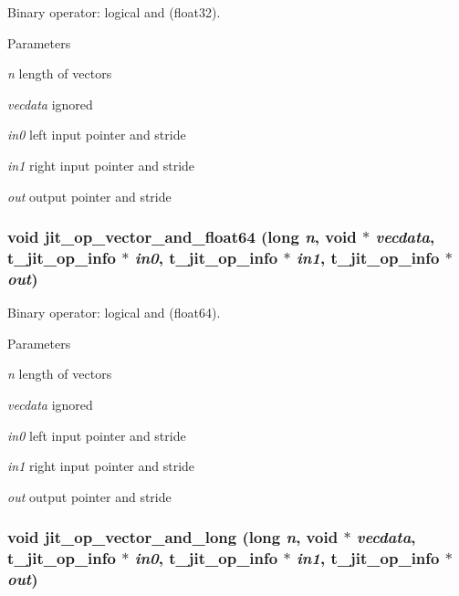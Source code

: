 Binary operator: logical and (float32). 
\begin{DoxyParams}{Parameters}
\item[{\em n}]length of vectors \item[{\em vecdata}]ignored \item[{\em in0}]left input pointer and stride \item[{\em in1}]right input pointer and stride \item[{\em out}]output pointer and stride \end{DoxyParams}
\hypertarget{group__opvecmod_ga3f7e9eec50ba1e410fca39b4eb1cbe82}{
\subsubsection[{jit\_\-op\_\-vector\_\-and\_\-float64}]{\setlength{\rightskip}{0pt plus 5cm}void jit\_\-op\_\-vector\_\-and\_\-float64 (long {\em n}, \/  void $\ast$ {\em vecdata}, \/  {\bf t\_\-jit\_\-op\_\-info} $\ast$ {\em in0}, \/  {\bf t\_\-jit\_\-op\_\-info} $\ast$ {\em in1}, \/  {\bf t\_\-jit\_\-op\_\-info} $\ast$ {\em out})}}
\label{group__opvecmod_ga3f7e9eec50ba1e410fca39b4eb1cbe82}


Binary operator: logical and (float64). 
\begin{DoxyParams}{Parameters}
\item[{\em n}]length of vectors \item[{\em vecdata}]ignored \item[{\em in0}]left input pointer and stride \item[{\em in1}]right input pointer and stride \item[{\em out}]output pointer and stride \end{DoxyParams}
\hypertarget{group__opvecmod_ga2151258ba2425ee38eefff33f6d88ae0}{
\subsubsection[{jit\_\-op\_\-vector\_\-and\_\-long}]{\setlength{\rightskip}{0pt plus 5cm}void jit\_\-op\_\-vector\_\-and\_\-long (long {\em n}, \/  void $\ast$ {\em vecdata}, \/  {\bf t\_\-jit\_\-op\_\-info} $\ast$ {\em in0}, \/  {\bf t\_\-jit\_\-op\_\-info} $\ast$ {\em in1}, \/  {\bf t\_\-jit\_\-op\_\-info} $\ast$ {\em out})}}
\label{group__opvecmod_ga2151258ba2425ee38eefff33f6d88ae0}


